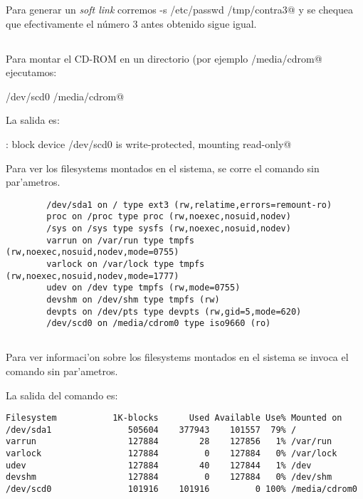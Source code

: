     Para generar un \emph{soft link} corremos \verb@ln -s /etc/passwd /tmp/contra3@ y se chequea que efectivamente el número 3 antes obtenido sigue igual.
    
	\subsection{}

		Para montar el CD-ROM en un directorio (por ejemplo \verb@/media/cdrom@ ejecutamos:

		\verb@mount /dev/scd0 /media/cdrom@

		La salida es:

		\verb@mount: block device /dev/scd0 is write-protected, mounting read-only@
		
		Para ver los filesystems montados en el sistema, se corre el comando \verb@mount@ sin par'ametros.
      \begin{mylisting}
			\begin{verbatim}
        /dev/sda1 on / type ext3 (rw,relatime,errors=remount-ro)
        proc on /proc type proc (rw,noexec,nosuid,nodev)
        /sys on /sys type sysfs (rw,noexec,nosuid,nodev)
        varrun on /var/run type tmpfs (rw,noexec,nosuid,nodev,mode=0755)
        varlock on /var/lock type tmpfs (rw,noexec,nosuid,nodev,mode=1777)
        udev on /dev type tmpfs (rw,mode=0755)
        devshm on /dev/shm type tmpfs (rw)
        devpts on /dev/pts type devpts (rw,gid=5,mode=620)
        /dev/scd0 on /media/cdrom0 type iso9660 (ro)
			\end{verbatim}
			\end{mylisting}

	\subsection{}
	
		Para ver informaci'on sobre los filesystems montados en el sistema se invoca el comando \verb@df@ sin par'ametros.

		La salida del comando es:
		\begin{mylisting}
		\begin{verbatim}
Filesystem           1K-blocks      Used Available Use% Mounted on
/dev/sda1               505604    377943    101557  79% /
varrun                  127884        28    127856   1% /var/run
varlock                 127884         0    127884   0% /var/lock
udev                    127884        40    127844   1% /dev
devshm                  127884         0    127884   0% /dev/shm
/dev/scd0               101916    101916         0 100% /media/cdrom0
		\end{verbatim}
		\end{mylisting}
	

